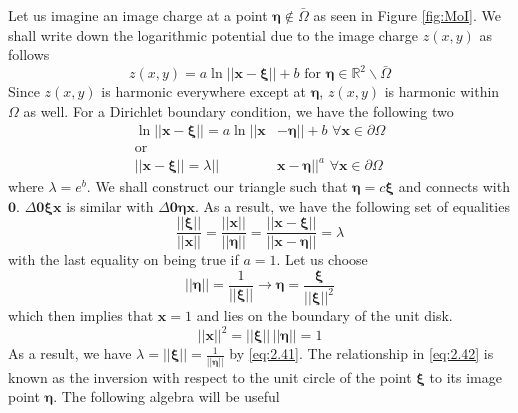 \documentclass{article}
\newcommand{\R}{\mathbb{R}}
\newcommand{\vb}[1]{\mathbf{ #1}}
\newcommand{\norm}[1]{|| #1 ||}
\newcommand{\bs}[1]{\boldsymbol{#1}}
\numberwithin{equation}{section}
\begin{document}
Let us imagine an image charge at a point $\boldsymbol{\eta} \notin \bar{\Omega}$ as seen in Figure \ref{fig:MoI}. We shall write down the logarithmic potential due to the image charge $z(x,y)$ as follows
\begin{equation}
    z(x,y) =a \ln ||\vb{x} -\boldsymbol{\xi}|| + b \text{ for } \boldsymbol{\eta} \in\R^2 \backslash\bar{\Omega} \label{eq:2.39}
\end{equation}
Since $z(x,y)$ is harmonic everywhere except at $\boldsymbol{\eta}$, $z(x,y)$ is harmonic within $\Omega$ as well. For a Dirichlet boundary condition, we have the following two
\begin{equation}
\begin{split}
    \ln||\vb{x} - \boldsymbol{\xi}|| = a\ln ||\vb{x} &- \boldsymbol{\eta}|| + b \hspace{4pt} \forall\vb{x} \in \partial \Omega \\
    \text{or}
    \\
    ||\vb{x} - \boldsymbol{\xi}|| = \lambda||&\vb{x} - \boldsymbol{\eta}||^a \hspace{4pt} \forall\vb{x} \in \partial\Omega    
\end{split}
\end{equation}
where $\lambda = e^b$. We shall construct our triangle such that $\boldsymbol{\eta} = c\boldsymbol{\xi}$ and connects with $\vb{0}$. $\Delta \boldsymbol{0\xi}\vb{x}$ is similar with $\Delta \boldsymbol{0\eta}\vb{x}$. As a result, we have the following set of equalities
\begin{equation}
    \frac{\norm{\boldsymbol{\xi}}}{\norm{\vb{x}}} =
    \frac{\norm{\vb{x}}}{\norm{\boldsymbol{\eta}}} = \frac{\norm{\vb{x} - \boldsymbol{\xi}}}{\norm{\vb{x}-\boldsymbol{\eta}}} = \lambda \label{eq:2.41}
\end{equation}
with the last equality on being true if $a=1$. Let us choose 
\begin{equation}
    \norm{\boldsymbol{\eta}} = \frac{1}{\norm{\boldsymbol{\xi}}} \rightarrow \boldsymbol{\eta} = \frac{\boldsymbol{\xi}}{\norm{\boldsymbol{\xi}}^2} \label{eq:2.42}
\end{equation}
which then implies that $\vb{x}=1$ and lies on the boundary of the unit disk.
\begin{equation*}
    \norm{\vb{x}}^2 = \norm{\bs{\xi}}\,\norm{\bs{\eta}} = 1
\end{equation*}
As a result, we have $\lambda= \norm{\bs{\xi}}=\frac{1}{\norm{\bs{\eta}}}$ by \eqref{eq:2.41}. The relationship in \eqref{eq:2.42} is known as the inversion with respect to the unit circle of the point $\bs{\xi}$ to its image point $\bs{\eta}$. The following algebra will be useful
\end{document}

